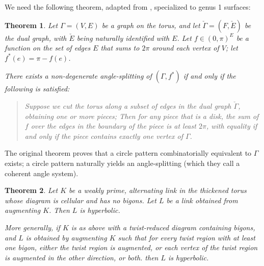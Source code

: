 \documentclass[11pt]{amsart}
\newcommand{\prpref}[1]{Proposition \ref{#1}}
\theoremstyle{plain}
\newtheorem{theorem}{Theorem}[section]
\theoremstyle{definition}
\newtheorem{remark}[theorem]{Remark}
\begin{document}
We need the following theorem,
adapted from \cite[Theorem 4]{BandS},
specialized to genus 1 surfaces:


\begin{theorem}{\cite[Theorem 4]{BandS}}
Let $\Gamma = (V,E)$ be a graph on the torus,
and let $\check{\Gamma} = (F,\check{E})$ be the dual graph,
with $\check{E}$ being naturally identified with $E$.
Let $f \in (0,\pi)^E$
be a function on the set of edges $E$
that sums to $2\pi$ around each vertex of $V$;
let $f^*(e) = \pi - f(e)$.


There exists a non-degenerate
angle-splitting of $(\Gamma,f^*)$
if and only if the following is satisfied:

\begin{quotation}
Suppose we cut the torus along a subset of edges in the dual graph
$\check{\Gamma}$, obtaining one or more pieces;
Then for any piece that is a disk,
the sum of $f$ over the edges in the boundary
of the piece is at least $2\pi$,
with equality if and only if the piece
contains exactly one vertex of $\Gamma$.
\end{quotation}

\label{t:bs-thm4}
\end{theorem}

The original theorem \cite[Theorem 4]{BandS}
proves that a circle pattern combinatorially equivalent to $\Gamma$
exists; a circle pattern naturally yields
an angle-splitting (which they call a coherent angle system).


\begin{theorem}
\label{t:auglink_hyp}
Let $K$ be a weakly prime, alternating link
in the thickened torus
whose diagram is cellular and has no bigons.
Let $L$ be a link obtained from augmenting $K$.
Then $L$ is hyperbolic.


More generally, if $K$ is as above with a twist-reduced diagram
containing bigons,
and $L$ is obtained by augmenting $K$
such that for every twist region with at least one bigon,
either the twist region is augmented,
or each vertex of the twist region is augmented
in the other direction,
or both.
then $L$ is hyperbolic.
\end{theorem}

%
%
\end{document}
